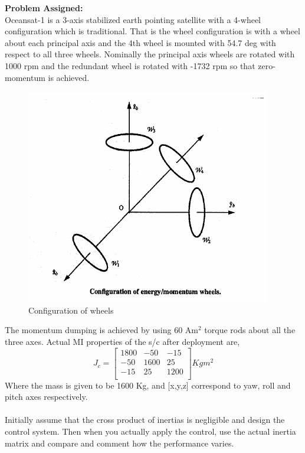 \documentclass[10pt,a4paper]{report}
\begin{document}
\textbf{Problem Assigned:}\\
Oceansat-1 is a 3-axis stabilized earth pointing satellite with a 4-wheel configuration which is traditional. That is the wheel configuration is with a wheel about each principal axis and the 4th wheel is mounted with 54.7 deg with respect to all three wheels. Nominally the principal axis wheels are rotated with 1000 rpm and the redundant wheel is rotated with -1732 rpm so that zero-momentum is achieved.
\begin{figure}[H]
\centering
\includegraphics[scale=0.5]{untitled.png}
\caption{Configuration of wheels}
\end{figure}
The momentum dumping is achieved by using 60 Am$ ^{2} $ torque rods about all the three axes. Actual MI properties of the s/c after deployment are,
\begin{equation}
J_{c}=\begin{bmatrix}
1800 & -50 & -15 \\
-50 & 1600 & 25 \\
-15 & 25 & 1200 \\
\end{bmatrix} Kg m^{2}
\end{equation}
Where the mass is given to be 1600 Kg, and [x,y,z] correspond to yaw, roll and pitch axes respectively.\\ \\
Initially assume that the cross product of inertias is negligible and design
the control system. Then when you actually apply the control, use the
actual inertia matrix and compare and comment how the performance
varies.
\\ \\
\end{document}
